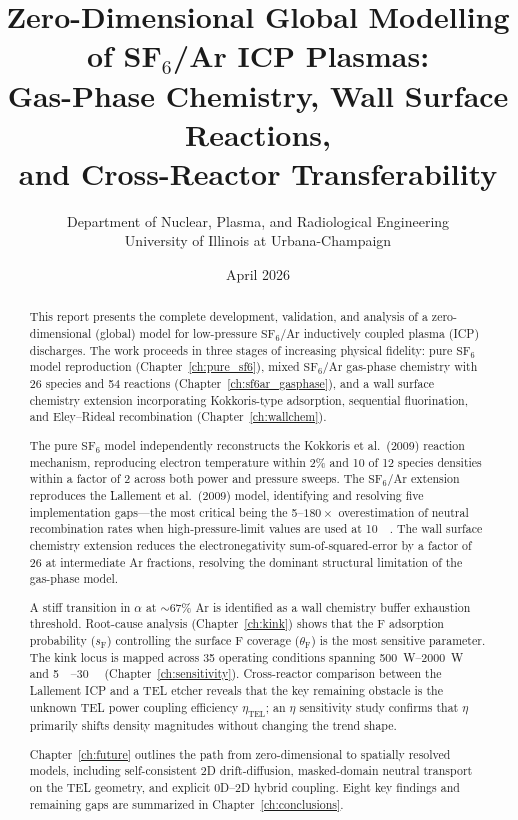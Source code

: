 \documentclass[11pt,a4paper]{report}
\title{Zero-Dimensional Global Modelling of SF$_6$/Ar ICP Plasmas:\\
Gas-Phase Chemistry, Wall Surface Reactions,\\
and Cross-Reactor Transferability}
\author{Department of Nuclear, Plasma, and Radiological Engineering\\
University of Illinois at Urbana-Champaign}
\date{April 2026}
\newcommand{\SFsix}{\mathrm{SF}_6}
\newcommand{\Ar}{\mathrm{Ar}}
\begin{document}
\maketitle


\begin{abstract}
This report presents the complete development, validation, and analysis of a zero-dimensional (global) model for low-pressure $\SFsix/\Ar$ inductively coupled plasma (ICP) discharges.  The work proceeds in three stages of increasing physical fidelity: pure $\SFsix$ model reproduction (Chapter~\ref{ch:pure_sf6}), mixed $\SFsix/\Ar$ gas-phase chemistry with 26 species and 54 reactions (Chapter~\ref{ch:sf6ar_gasphase}), and a wall surface chemistry extension incorporating Kokkoris-type adsorption, sequential fluorination, and Eley--Rideal recombination (Chapter~\ref{ch:wallchem}).

The pure $\SFsix$ model independently reconstructs the Kokkoris et al.\ (2009) reaction mechanism, reproducing electron temperature within 2\% and 10 of 12 species densities within a factor of 2 across both power and pressure sweeps.  The $\SFsix/\Ar$ extension reproduces the Lallement et al.\ (2009) model, identifying and resolving five implementation gaps---the most critical being the 5--$180\times$ overestimation of neutral recombination rates when high-pressure-limit values are used at \SI{10}{\milli\torr}.  The wall surface chemistry extension reduces the electronegativity sum-of-squared-error by a factor of 26 at intermediate Ar fractions, resolving the dominant structural limitation of the gas-phase model.

A stiff transition in $\alpha$ at ${\sim}67\%$ Ar is identified as a wall chemistry buffer exhaustion threshold.  Root-cause analysis (Chapter~\ref{ch:kink}) shows that the F adsorption probability ($s_\mathrm{F}$) controlling the surface F coverage ($\theta_\mathrm{F}$) is the most sensitive parameter.  The kink locus is mapped across 35 operating conditions spanning \SIrange{500}{2000}{\watt} and \SIrange{5}{30}{\milli\torr} (Chapter~\ref{ch:sensitivity}).  Cross-reactor comparison between the Lallement ICP and a TEL etcher reveals that the key remaining obstacle is the unknown TEL power coupling efficiency $\eta_\mathrm{TEL}$; an $\eta$ sensitivity study confirms that $\eta$ primarily shifts density magnitudes without changing the trend shape.

Chapter~\ref{ch:future} outlines the path from zero-dimensional to spatially resolved models, including self-consistent 2D drift-diffusion, masked-domain neutral transport on the TEL geometry, and explicit 0D--2D hybrid coupling.  Eight key findings and remaining gaps are summarized in Chapter~\ref{ch:conclusions}.
\end{abstract}
\end{document}

